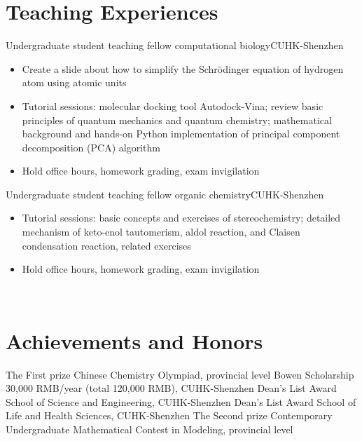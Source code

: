 \documentclass[12pt,a4paper,sans]{moderncv}
\newcommand\linksymbol{\scriptsize\faExternalLink*}
\newcommand{\cvsection}[1]{\section{{#1}}}
\begin{document}
\cvsection{Teaching Experiences}
{Undergraduate student teaching fellow}{}
{computational biology}{CUHK-Shenzhen}
{
    \begin{itemize}[itemsep=2pt]
        \item Create a slide about how to simplify the Schrödinger equation of hydrogen atom using
        atomic units
        \item Tutorial sessions: molecular docking tool Autodock-Vina;
        review basic principles of quantum mechanics and quantum chemistry;
        mathematical background and hands-on Python implementation of principal component decomposition (PCA) algorithm
        \href{https://github.com/haoran0115/pca-implementation}{\linksymbol}
        \item Hold office hours, homework grading, exam invigilation
    \end{itemize}
}
\vspace{0.5em}
{Undergraduate student teaching fellow}{}
{organic chemistry}{CUHK-Shenzhen}
{
    \begin{itemize}[itemsep=2pt]
        \item Tutorial sessions: basic concepts and exercises of stereochemistry;
        detailed mechanism of keto-enol tautomerism, aldol reaction,
        and Claisen condensation reaction, related exercises
        \item Hold office hours, homework grading, exam invigilation
    \end{itemize}
}
\
\cvsection{Achievements and Honors}
{The First prize}{}
{Chinese Chemistry Olympiad, provincial level}{}
{}
{Bowen Scholarship}{}
{30,000 RMB/year (total 120,000 RMB), CUHK-Shenzhen}{}
{}
{Dean's List Award}{}
{School of Science and Engineering, CUHK-Shenzhen}{}
{}
{Dean's List Award}{}
{School of Life and Health Sciences, CUHK-Shenzhen}{}
{}
{The Second prize}{}
{Contemporary Undergraduate Mathematical Contest in Modeling, provincial level}{}
{}

\end{document}
